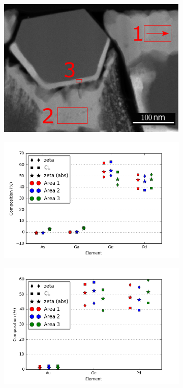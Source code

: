 \begin{figure}
	\centering
	\begin{subfigure}{0.5\textwidth}
		\includegraphics[width=\textwidth]{fig/q/B-C-F/BCF}
		\caption{}
		\label{fig:BCF-overview}
	\end{subfigure}
	\hfill
	\begin{subfigure}{0.7\textwidth}
		\includegraphics[width=\textwidth]{fig/q/B-C-F/AsGaGePd}
		\caption{}
		\label{fig:BCF1}
	\end{subfigure}
	\hfill
	\begin{subfigure}{0.7\textwidth}
		\includegraphics[width=\textwidth]{fig/q/B-C-F/AuGePd}

\end{subfigure}
\end{figure}
